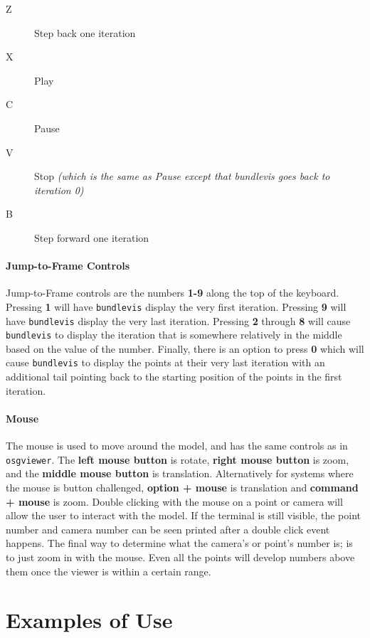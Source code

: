\begin{myindentpar}{3cm}
\begin{description}
  \item[Z] Step back one iteration
  \item[X] Play
  \item[C] Pause
  \item[V] Stop \emph{(which is the same as Pause except that
    bundlevis goes back to iteration 0)}
  \item[B] Step forward one iteration
\end{description}
\end{myindentpar}

\paragraph{Jump-to-Frame Controls}
Jump-to-Frame controls are the numbers \textbf{1-9} along the top of the
keyboard. Pressing \textbf{1} will have \texttt{bundlevis} display the
very first iteration. Pressing \textbf{9} will have \texttt{bundlevis}
display the very last iteration. Pressing \textbf{2} through
\textbf{8} will cause \texttt{bundlevis} to display the iteration that
is somewhere relatively in the middle based on the value of the
number. Finally, there is an option to press \textbf{0} which will
cause \texttt{bundlevis} to display the points at their very last
iteration with an additional tail pointing back to the starting
position of the points in the first iteration.

\paragraph{Mouse}
The mouse is used to move around the model, and has the same controls
as in \texttt{osgviewer}. The \textbf{left mouse button} is rotate,
\textbf{right mouse button} is zoom, and the \textbf{middle mouse
  button} is translation. Alternatively for systems where the mouse is
button challenged, \textbf{option + mouse} is translation and
\textbf{command + mouse} is zoom. Double clicking with the mouse on a
point or camera will allow the user to interact with the model. If the
terminal is still visible, the point number and camera number can be
seen printed after a double click event happens. The final way to
determine what the camera's or point's number is; is to just zoom in
with the mouse. Even all the points will develop numbers above them
once the viewer is within a certain range.

\section{Examples of Use}

